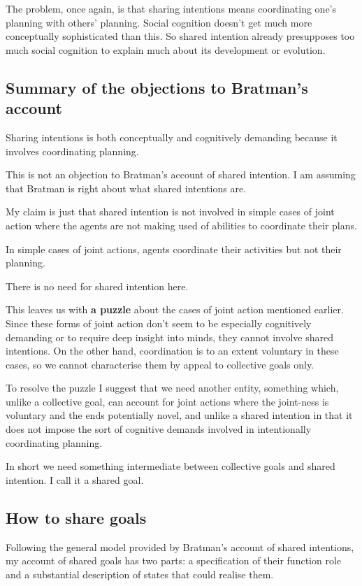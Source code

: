 \documentclass[12pt,a4paper]{extarticle}
\begin{document}
The problem, once again, is that sharing intentions means coordinating one's planning with others' planning.
Social cognition doesn't get much more conceptually sophisticated than this.
So shared intention already presupposes too much social cognition to explain much about its development or evolution.


\subsection{Summary of the objections to Bratman's account}

Sharing intentions is both conceptually and cognitively demanding because it involves coordinating planning.

This is not an objection to Bratman's account of shared intention.  I am assuming that Bratman is right about what shared intentions are.

My claim is just that shared intention is not involved in simple cases of joint action where the agents are not making used of abilities to coordinate their plans.

In simple cases of joint actions, agents coordinate their activities but not their planning.

There is no need for shared intention here.

This leaves us with \textbf{a puzzle} about the cases of joint action mentioned earlier. 
Since these forms of joint action don’t seem to be especially cognitively demanding or to require deep insight into minds, they cannot involve shared intentions.  On the other hand, coordination is to an extent voluntary in these cases, so we cannot characterise them by appeal to collective goals only.

To resolve the puzzle I suggest that we need another entity, something which, unlike a collective goal, can account for joint actions where the joint-ness is voluntary and the ends potentially novel, and unlike a shared intention in that it does not impose the sort of cognitive demands involved in intentionally coordinating planning.

In short we need something intermediate between collective goals and shared intention.  I call it a shared goal.


\subsection{How to share goals}
Following the general model provided by Bratman’s account of shared intentions, my account of shared goals has two parts: a specification of their function role and a substantial description of states that could realise them.
\end{document}
